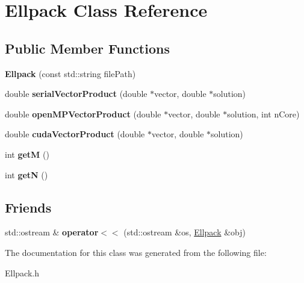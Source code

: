 \hypertarget{classEllpack}{}\section{Ellpack Class Reference}
\label{classEllpack}
\subsection*{Public Member Functions}
\begin{DoxyCompactItemize}
\item 
\mbox{\label{classEllpack_ac7de6aaf6b7059f19d66a6017bbe7786}} 
{\bfseries Ellpack} (const std\+::string file\+Path)
\item 
\mbox{\label{classEllpack_a613fea90da94e1afe55b47fdea23ab05}} 
double {\bfseries serial\+Vector\+Product} (double $\ast$vector, double $\ast$solution)
\item 
\mbox{\label{classEllpack_a3152c4263e40e7038e08eb77d57242b7}} 
double {\bfseries open\+M\+P\+Vector\+Product} (double $\ast$vector, double $\ast$solution, int n\+Core)
\item 
\mbox{\label{classEllpack_a7df7dfcd9b568002031397dd10ab2c48}} 
double {\bfseries cuda\+Vector\+Product} (double $\ast$vector, double $\ast$solution)
\item 
\mbox{\label{classEllpack_a1d299682fe95ebb2f69f056cc9444a26}} 
int {\bfseries getM} ()
\item 
\mbox{\label{classEllpack_ab51e486fdc6e6e8480d150dbf880e0da}} 
int {\bfseries getN} ()
\end{DoxyCompactItemize}
\subsection*{Friends}
\begin{DoxyCompactItemize}
\item 
\mbox{\label{classEllpack_ab87e849e61f9ae88f2aa10e7db3ef0f5}} 
std\+::ostream \& {\bfseries operator$<$$<$} (std\+::ostream \&os, \mbox{\hyperlink{classEllpack}{Ellpack}} \&obj)
\end{DoxyCompactItemize}


The documentation for this class was generated from the following file\+:\begin{DoxyCompactItemize}
\item 
Ellpack.\+h\end{DoxyCompactItemize}
